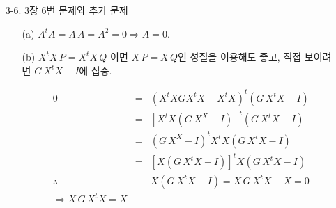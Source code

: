 \documentclass[fleqn, a4paper]{article}
\begin{document}
\newcommand{\bm}[1]{\mbox{\boldmath{$#1$}}}

\begin{enumerate}
\item[3-6.] 3장 6번 문제와 추가 문제 
\begin{enumerate}
\item[(a)] $A^tA = A\,A = A^2 = 0\Rightarrow A = 0$.
\item[(b)] $X^tX\,P = X^tX\,Q$ 이면 $X\,P = X\,Q$인 성질을 이용해도 좋고, 직접 보이려면 $G\,X^tX - I$에 집중.

\begin{eqnarray*}
0&=&(X^tXGX^tX-X^tX)^t(G\,X^tX-I)\\
&=&[X^tX(G\,X^X-I)]^t(G\,X^tX-I)\\
&=&(G\,X^X-I)^tX^tX(G\,X^tX-I)\\
&=&[X(G\,X^tX-I)]^tX(G\,X^tX-I)\\
\therefore &&X(G\,X^tX-I)=X\,G\,X^tX-X=0\\
\Rightarrow X\,G\,X^tX = X
\end{eqnarray*}
\end{enumerate}
\end{enumerate}
\end{document}
